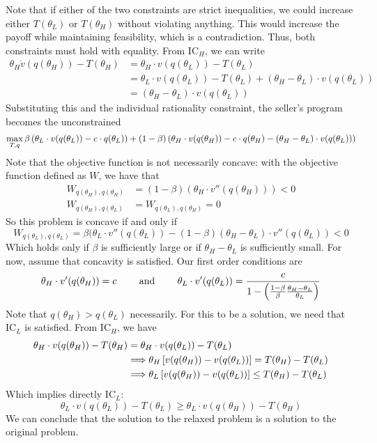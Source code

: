 \documentclass[10pt]{article}
\begin{document}
\begin{example}
	Note that if either of the two constraints are strict inequalities, we could increase either $T(\theta_L)$ or $T(\theta_H)$ without violating anything. This would increase the payoff while maintaining feasibility, which is a contradiction. Thus, both constraints must hold with equality. From IC$_H$, we can write \begin{align*}\theta_H \dot v(q(\theta_H)) - T(\theta_H) &= \theta_H \cdot v(q(\theta_L)) - T(\theta_L) \\ &= \theta_L \cdot v(q(\theta_L)) - T(\theta_L) + (\theta_H-\theta_L)\cdot v(q(\theta_L)) \\ &= (\theta_H-\theta_L)\cdot v(q(\theta_L))\end{align*}Substituting this and the individual rationality constraint, the seller's program becomes the unconstrained\[\max_{T,q} \beta \left( \theta_L \cdot v(q(\theta_L)) - c\cdot q(\theta_L)\right) + (1-\beta) \left( \theta_H \cdot v(q(\theta_H)) - c\cdot q(\theta_H) - (\theta_H - \theta_L) \cdot v(q(\theta_L))\right)\]Note that the objective function is not necessarily concave: with the objective function defined as $W$, we have that \begin{align*} W_{q(\theta_H),q(\theta_H)} &= (1-\beta)(\theta_H \cdot v''(q(\theta_H))) < 0 \\ W_{q(\theta_H),q(\theta_L)} &= W_{q(\theta_L),q(\theta_H)} = 0 \end{align*}So this problem is concave if and only if\[W_{q(\theta_L),q(\theta_L)} = \beta(\theta_L \cdot v''(q(\theta_L)) - (1-\beta)(\theta_H - \theta_L) \cdot v''(q(\theta_L)) < 0\]Which holds only if $\beta$ is sufficiently large or if $\theta_H - \theta_L$ is sufficiently small. For now, assume that concavity is satisfied. Our first order conditions are\[\theta_H \cdot v'(q(\theta_H)) = c \qquad \text{ and } \qquad \theta_L \cdot v'(q(\theta_L)) = \frac{c}{1-\left( \frac{1-\beta}{\beta}\frac{\theta_H-\theta_L}{\theta_L}\right)}\]Note that $q(\theta_H) > q(\theta_L)$ necessarily. For this to be a solution, we need that IC$_L$ is satisfied. From IC$_H$, we have \begin{align*} \theta_H \cdot v(q(\theta_H)) - T(\theta_H) &= \theta_H \cdot v(q(\theta_L)) - T(\theta_L) \\ &\Longrightarrow \theta_H \left[ v(q(\theta_H)) - v(q(\theta_L))\right] = T(\theta_H) - T(\theta_L) \\ &\Longrightarrow \theta_L \left[ v(q(\theta_H)) - v(q(\theta_L))\right] \le T(\theta_H) - T(\theta_L)\end{align*}Which implies directly IC$_L$:\[\theta_L \cdot v(q(\theta_L)) - T(\theta_L) \ge \theta_L \cdot v(q(\theta_H)) - T(\theta_H)\]We can conclude that the solution to the relaxed problem is a solution to the original problem. 
	

\end{example}
\end{document}
